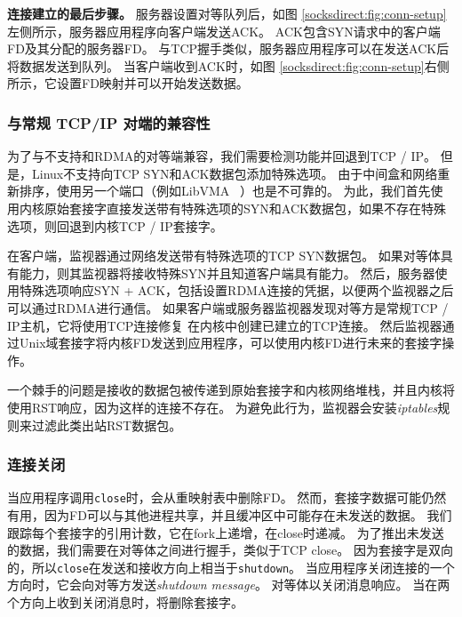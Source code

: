 \textbf {连接建立的最后步骤。}
服务器设置对等队列后，如图 \ref {socksdirect:fig:conn-setup}左侧所示，服务器应用程序向客户端发送ACK。 ACK包含SYN请求中的客户端FD及其分配的服务器FD。
与TCP握手类似，服务器应用程序可以在发送ACK后将数据发送到队列。
当客户端收到ACK时，如图 \ref {socksdirect:fig:conn-setup}右侧所示，它设置FD映射并可以开始发送数据。


\subsubsection{与常规 TCP/IP 对端的兼容性}


为了与不支持\sys {}和RDMA的对等端兼容，我们需要检测\sys {}功能并回退到TCP / IP。
但是，Linux不支持向TCP SYN和ACK数据包添加特殊选项。
由于中间盒和网络重新排序，使用另一个端口（例如LibVMA~ \cite {libvma}）也是不可靠的。
为此，我们首先使用内核原始套接字直接发送带有特殊选项的SYN和ACK数据包，如果不存在特殊选项，则回退到内核TCP / IP套接字。

在客户端，监视器通过网络发送带有特殊选项的TCP SYN数据包。
如果对等体具有\sys {}能力，则其监视器将接收特殊SYN并且知道客户端具有\sys {}能力。
然后，服务器使用特殊选项响应SYN + ACK，包括设置RDMA连接的凭据，以便两个监视器之后可以通过RDMA进行通信。
如果客户端或服务器监视器发现对等方是常规TCP / IP主机，它将使用TCP连接修复 \cite {tcp-connection-repair}在内核中创建已建立的TCP连接。
然后监视器通过Unix域套接字将内核FD发送到应用程序，\libipc {}可以使用内核FD进行未来的套接字操作。


一个棘手的问题是接收的数据包被传递到原始套接字和内核网络堆栈，并且内核将使用RST响应，因为这样的连接不存在。
为避免此行为，监视器会安装\emph {iptables}规则来过滤此类出站RST数据包。

%	


\subsubsection{连接关闭}



当应用程序调用\texttt {close}时，\libipc {}会从重映射表中删除FD。
然而，套接字数据可能仍然有用，因为FD可以与其他进程共享，并且缓冲区中可能存在未发送的数据。
我们跟踪每个套接字的引用计数，它在fork上递增，在close时递减。
为了推出未发送的数据，我们需要在对等体之间进行握手，类似于TCP close。
因为套接字是双向的，所以\texttt {close}在发送和接收方向上相当于\texttt {shutdown}。
当应用程序关闭连接的一个方向时，它会向对等方发送\emph {shutdown message}。
对等体以关闭消息响应。
当\libipc {}在两个方向上收到关闭消息时，将删除套接字。


